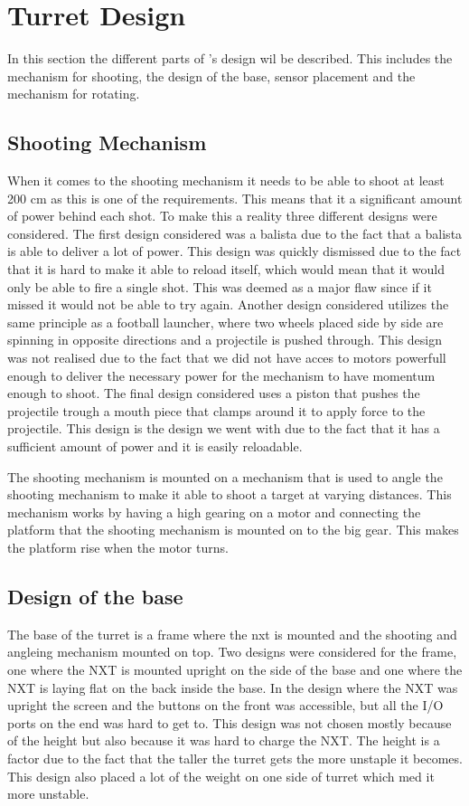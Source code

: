 \section{Turret Design}
In this section the different parts of \namep's design wil be described. This
includes the mechanism for shooting, the design of the base, sensor placement
and the mechanism for rotating.

\subsection{Shooting Mechanism}
When it comes to the shooting mechanism it needs to be able to shoot at least
200 cm as this is one of the requirements. This means that it a significant
amount of power behind each shot. To make this a reality three different designs
were considered. The first design considered was a balista due to the fact that
a balista is able to deliver a lot of power. This design was quickly dismissed
due to the fact that it is hard to make it able to reload itself, which would
mean that it would only be able to fire a single shot. This was deemed as a
major flaw since if it missed it would not be able to try again. Another design
considered utilizes the same principle as a football launcher, where two wheels
placed side by side are spinning in opposite directions and a projectile is
pushed through. 
This design was not realised due to the fact that we did not have acces to motors
powerfull enough to deliver the necessary power for the mechanism to have
momentum enough to shoot. The final design considered uses a piston that pushes
the projectile trough a mouth piece that clamps around it to apply force to the
projectile. This design is the design we went with due to the fact that it has
a sufficient amount of power and it is easily reloadable.\nl

The shooting mechanism is mounted on a mechanism that is used to angle the
shooting mechanism to make it able to shoot a target at varying distances. This
mechanism works by having a high gearing on a motor and connecting the platform
that the shooting mechanism is mounted on to the big gear. This makes the
platform rise when the motor turns.

\subsection{Design of the base}
The base of the turret is a frame where the nxt is mounted and the shooting and
angleing mechanism mounted on top. Two designs were considered for the frame,
one where the NXT is mounted upright on the side of the base and one where the
NXT is laying flat on the back inside the base. In the design where the NXT was
upright the screen and the buttons on the front was accessible, but all the I/O
ports on the end was hard to get to. This design was not chosen mostly because
of the height but also because it was hard to charge the NXT. The height is a
factor due to the fact that the taller the turret gets the more unstaple it
becomes. This design also placed a lot of the weight on one side of turret
which med it more unstable.\nl

